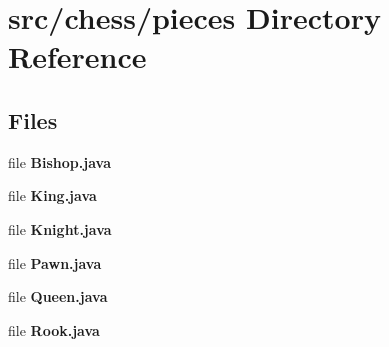 \section{src/chess/pieces Directory Reference}
\label{dir_96caa8241013ee1be11b57209aa209e6}
\subsection*{Files}
\begin{DoxyCompactItemize}
\item 
file {\bf Bishop.\+java}
\item 
file {\bf King.\+java}
\item 
file {\bf Knight.\+java}
\item 
file {\bf Pawn.\+java}
\item 
file {\bf Queen.\+java}
\item 
file {\bf Rook.\+java}
\end{DoxyCompactItemize}

